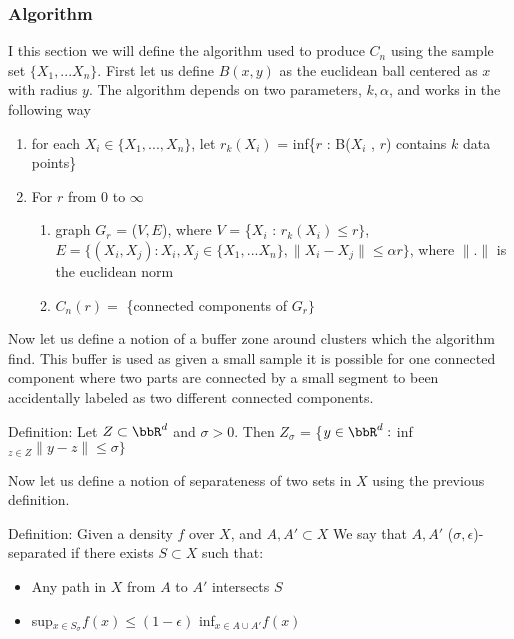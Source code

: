 \documentclass{article}
\begin{document}
\subsubsection{Algorithm}
I this section we will define the algorithm used to produce $C_n$ using the sample set $\{X_1, ... X_n\}$.  First let us define $B(x,y)$ as the euclidean ball centered as $x$ with radius $y$. The algorithm depends on two parameters, $k ,\alpha$, and works in the following way
\begin{enumerate}
\item for each $X_i \in \{X_1,...,X_n\}$, let $r_k(X_i)$ = inf\{$r$ : B($X_i$
, $r$) contains $k$ data points\}
\item For $r$ from 0 to $\infty$
\begin{enumerate}
    \item graph $G_r$ = ($V,E$), where $V$ =  \{$X_i$
: $r_k(X_i) \leq r\}$, $E = \{(X_i, X_j): X_i, X_j \in \{X_1,...X_n\}, \|X_i -X_j \| \leq \alpha r\}$, where $\|.\|$ is the euclidean norm
    \item $C_n(r) =$ \{connected components of $G_r\}$
  \end{enumerate}
\end{enumerate}

Now let us define a notion of a buffer zone around clusters which the algorithm find.  This buffer is used as given a small sample it is possible for one connected component where two parts are connected by a small segment to been accidentally labeled as two different connected components.  

\vspace{\baselineskip}
\noindent Definition: Let $Z \subset \bbR^d$ and $\sigma > 0$.  Then $Z_{\sigma}$ = \{$y \in \bbR^d :$ inf$_{z \in Z}\|y-z\| \leq \sigma\}$

\vspace{\baselineskip}

Now let us define a notion of separateness of two sets in $X$ using the previous definition. 

\vspace{\baselineskip}
\noindent Definition: Given a density $f$ over $X$, and $A, A' \subset X$ We say that $A, A'$ ($\sigma, \epsilon$)-separated if there
exists $S \subset X$ such that:
\begin{itemize}
  \item Any path in $X$ from $A$ to $A'$
intersects $S$
  \item sup$_{x \in S_{\sigma}} f(x) \leq (1 - \epsilon)$ inf$_{x \in A \cup A'}f(x)$
\end{itemize}
\end{document}
